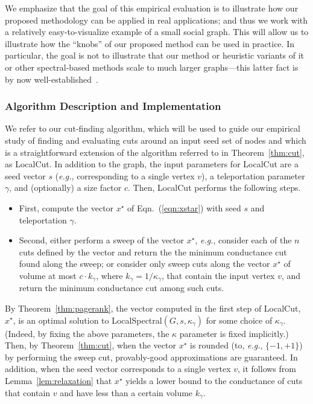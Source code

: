 \documentclass[11pt]{article}
\begin{document}
We emphasize that the goal of this empirical evaluation is to illustrate 
how our proposed methodology can be applied in real applications; and thus 
we work with a relatively easy-to-visualize example of a small social graph.
This will allow us to illustrate how the ``knobs'' of our proposed method 
can be used in practice.
In particular, the goal is not to illustrate that our method or heuristic 
variants of it or other spectral-based methods scale to much larger 
graphs---this latter fact is by now 
well-established~\cite{andersen06seed,LLDM08_communities_CONF,LLDM09_communities_IM,LLM10_communities_CONF}.



\subsubsection{Algorithm Description and Implementation}

We refer to our cut-finding algorithm, which will be used to guide our 
empirical study of finding and evaluating cuts around an input seed set of 
nodes and which is a straightforward extension of the algorithm referred 
to in  Theorem~\ref{thm:cut}, as \textsf{LocalCut}.
In addition to the graph, the input parameters for \textsf{LocalCut} are a 
seed vector $s$ (\emph{e.g.}, corresponding to a single vertex $v$), a 
teleportation parameter $\gamma$, and (optionally) a size factor $c$.
Then, \textsf{LocalCut} performs the following steps.
\begin{itemize}
\item
First, compute the vector $x^{\star}$ of Eqn.~(\ref{eqn:xstar}) with seed $s$ 
and teleportation $\gamma$. 
\item
Second, either
perform a sweep of the vector $x^{\star}$, \emph{e.g.}, consider each of the
$n$ cuts defined by the vector and return the the minimum conductance cut 
found along the sweep;
or 
consider only sweep cuts along the vector $x^{\star}$ of volume at most 
$c \cdot k_{\gamma}$, 
where $k_{\gamma}=1/\kappa_{\gamma}$, 
that contain the input vertex $v$, and return the 
minimum conductance cut among such cuts.
\end{itemize}

\noindent
By Theorem~\ref{thm:pagerank}, the vector computed in the first step of 
\textsf{LocalCut}, $x^\star$, is an optimal solution to 
\textsf{LocalSpectral}$(G,s,\kappa_{\gamma})$ for some choice of 
$\kappa_{\gamma}$.
(Indeed, by fixing the above parameters, the $\kappa$ parameter is fixed 
implicitly.)
Then, by Theorem~\ref{thm:cut}, when the vector $x^\star$ is rounded 
(to, \emph{e.g.}, $\{-1,+1\}$) by performing the sweep cut, provably-good 
approximations are guaranteed. 
In addition, when the seed vector corresponds to a single vertex $v$, it
follows from Lemma~\ref{lem:relaxation} that $x^\star$ yields a lower 
bound to the conductance of cuts that contain $v$ and have less than a 
certain volume $k_\gamma$.
\end{document}
